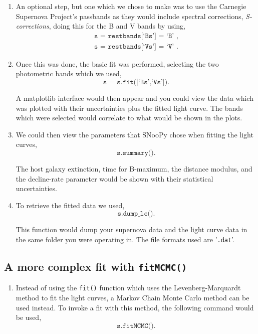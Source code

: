 \documentclass[twocolumn]{revtex4}
\begin{document}
{\begin{enumerate}
 \item An optional step, but one which we chose to make was to use the Carnegie Supernova Project's passbands as they would include spectral corrections, \textit{S-corrections}, doing this for the B and V bands by using,
 \begin{equation*}
 \begin{split}
 \texttt{s = restbands[`Bs'] = `B' } , \\ 
 \texttt{s = restbands[`Vs'] = `V' } .
 \end{split}
 \end{equation*}
 
 \item Once this was done, the basic fit was performed, selecting the two photometric bands which we used,
 \begin{equation*}
 \texttt{s = s.fit([`Bs',`Vs'])} . 
 \end{equation*}
 
 A matplotlib interface would then appear and you could view the data which was plotted with their uncertainties plus the fitted light curve. The bands which were selected would correlate to what would be shown in the plots.
 
 \item We could then view the parameters that SNooPy chose when fitting the light curves,
 \begin{equation*}
 \texttt{s.summary()} .
 \end{equation*}
 
 The host galaxy extinction, time for B-maximum, the distance modulus, and the decline-rate parameter would be shown with their statistical uncertainties.
 
 \item To retrieve the fitted data we used,
 \begin{equation*}
 \texttt{s.dump\_lc()} .
 \end{equation*}
 
 This function would dump your supernova data and the light curve data in the same folder you were operating in. The file formats used are '\texttt{.dat}'.
\end{enumerate}

\subsection{A more complex fit with \texttt{fitMCMC()}}
\begin{enumerate}
 \item Instead of using the \texttt{fit()} function which uses the Levenberg-Marquardt method to fit the light curves, a Markov Chain Monte Carlo method can be used instead. To invoke a fit with this method, the following command would be used, 
 \begin{equation*}
 \texttt{s.fitMCMC()} .
 \end{equation*}
 

\end{enumerate}}
\end{document}
